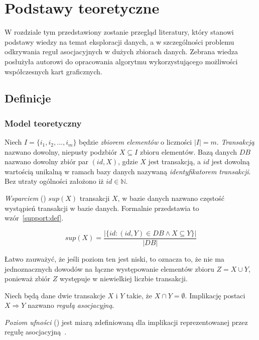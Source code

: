 
\chapter{Podstawy teoretyczne}

W rozdziale tym przedstawiony zostanie przegląd literatury, który stanowi podstawy wiedzy na temat eksploracji danych, a w szczególności problemu odkrywania reguł asocjacyjnych w dużych zbiorach danych. Zebrana wiedza posłużyła autorowi do opracowania algorytmu wykorzystującego możliwości współczesnych kart graficznych.

\section{Definicje}

\subsection{Model teoretyczny}

Niech $I = \lbrace i_1,i_2,...,i_m \rbrace$ będzie \emph{zbiorem elementów} o liczności $|I| = m$. \emph{Transakcją} nazwano dowolny, niepusty podzbiór $X \subseteq I$ zbioru elementów. Bazą danych $DB$ nazwano dowolny zbiór par $(id, X)$, gdzie $X$ jest transakcją, a $id$ jest dowolną wartością unikalną w ramach bazy danych nazywaną \emph{identyfikatorem transakcji}. Bez utraty ogólności założono iż $id\in \mathbb{N}$. 

\emph{Wsparciem} () $sup(X)$ transakcji $X$, w bazie danych nazwano częstość wystąpień transakcji w bazie danych. Formalnie przedstawia to wzór~\ref{support:def}.

\begin{equation}
\label{support:def}
sup(X)=\frac{| \lbrace id: (id,Y)\in DB \wedge X\subseteq Y \rbrace |}{|DB|}
\end{equation} 

Łatwo zauważyć, że jeśli poziom ten jest niski, to oznacza to, że nie ma jednoznacznych dowodów na łączne występowanie elementów zbioru $Z = X \cup Y$, ponieważ zbiór $Z$ występuje w niewielkiej liczbie transakcji. 

\begin{df}\label{regula:def}
Niech będą dane dwie transakcje $X$ i $Y$ takie, że $X\cap Y=\emptyset$. Implikację postaci $X\Rightarrow  Y$ nazwano \emph{regułą asocjacyjną}.
\end{df}

\emph{Poziom ufności} () jest miarą zdefiniowaną dla implikacji reprezentowanej przez regułę asocjacyjną~\cite{Elmasri:db}. 

